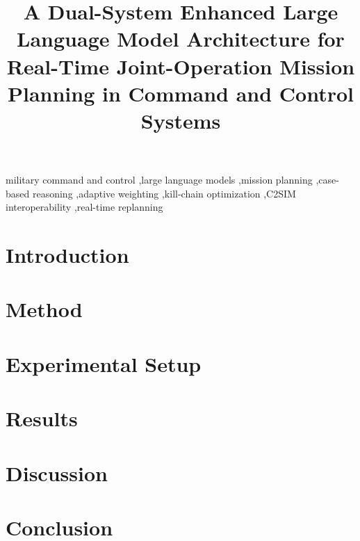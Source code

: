 \documentclass[preprint,12pt]{elsarticle}
\begin{document}
\begin{frontmatter}

\title{A Dual-System Enhanced Large Language Model Architecture for Real-Time Joint-Operation Mission Planning in Command and Control Systems}


\begin{abstract}

\end{abstract}

\begin{highlights}

\end{highlights}

\begin{keyword}
military command and control \sep large language models \sep mission planning \sep case-based reasoning \sep adaptive weighting \sep kill-chain optimization \sep C2SIM interoperability \sep real-time replanning
\end{keyword}

\end{frontmatter}

\section{Introduction}


\section{Method}


\section{Experimental Setup}


\section{Results}
\label{sec:results}


\section{Discussion}
\label{sec:discussion}


\section{Conclusion}

\end{document}
